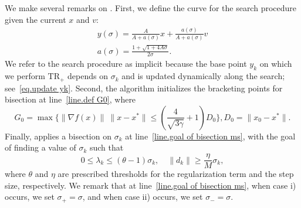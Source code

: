 \documentclass{mcom-l}
\newcommand{\trp}{\textrm{TR}_+}
\numberwithin{equation}{section}
\begin{document}
\begin{algorithm}[!ht]
    \caption{Bisection for }\label{alg.bisection ms}
    \begin{algorithmic}[1]
        \STATE{Set $\sigma_- = \sqrt{\frac{2M\epsilon}{1+2\theta}}, \ \sigma_+=\sqrt{\frac{MG_0}{\eta}}$, $(\lambda_-,d_-) = \trp(y(\sigma_-),\sigma_-,\frac{1}{M}\sigma_-)$
            \label{line.def G0}
        }
        \label{line.early termination ms}
        \ELSE
        \label{line.goal of bisection ms}
        \STATE{
            $(\lambda,d) = \trp(y(\sigma),\sigma,\frac{1}{M}\sigma)$
        }
        \ENDWHILE
        \ENDIF
    \end{algorithmic}
\end{algorithm}

We make several remarks on . First, we define the curve for the search procedure given the current $x$ and $v$:
\begin{gather}
    \label{eq.update yk}
    y(\sigma) = \frac{A}{A+a(\sigma)}x+\frac{a(\sigma)}{A+a(\sigma)}v\\
    \label{eq.update ak}
    a(\sigma) =\frac{1+\sqrt{1+4A\sigma}}{2\sigma}.
\end{gather}
We refer to the search procedure as implicit because the base point $y_k$ on which we perform $\trp$ depends on $\sigma_k$ and is updated dynamically along the search; see~\eqref{eq.update yk}. Second, the algorithm initializes the bracketing points for bisection at line~\ref{line.def G0}, where
$$G_0 = \max\{\|\nabla f(x)\| \ \|x-x^*\|\leq \left(\frac{4}{\sqrt{3\gamma}}+1\right)D_0\}, D_0 = \|x_0-x^*\|.$$
Finally,  applies a bisection on $\sigma_k$ at line~\ref{line.goal of bisection ms}, with the goal of finding a value of $\sigma_k$ such that
\begin{equation}
    \label{eq.relation lambda sigma}
    0 \leq \lambda_k \leq (\theta - 1)\sigma_k, \quad \|d_k\| \geq \frac{\eta}{M} \sigma_k,
\end{equation}
where $\theta$ and $\eta$ are prescribed thresholds for the regularization term and the step size, respectively. We remark that at line~\ref{line.goal of bisection ms}, when case i) occurs, we set $\sigma_+ = \sigma$, and when case ii) occurs, we set $\sigma_- = \sigma$.
\end{document}
